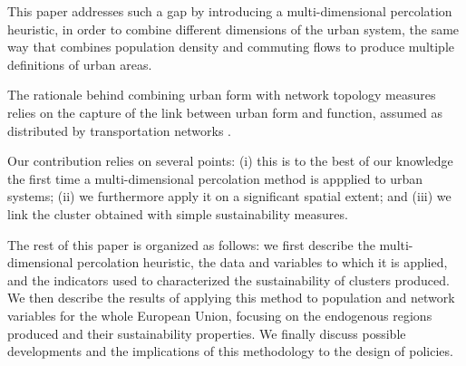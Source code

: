 \documentclass{jimis-en}
\begin{document}
This paper addresses such a gap by introducing a multi-dimensional percolation heuristic, in order to combine different dimensions of the urban system, the same way that \cite{cottineau2018defining} combines population density and commuting flows to produce multiple definitions of urban areas.

The rationale behind combining urban form with network topology measures relies on the capture of the link between urban form and function, assumed as distributed by transportation networks \citep{raimbault2018caracterisation}.







Our contribution relies on several points: (i) this is to the best of our knowledge the first time a multi-dimensional percolation method is appplied to urban systems; (ii) we furthermore apply it on a significant spatial extent; and (iii) we link the cluster obtained with simple sustainability measures.


The rest of this paper is organized as follows: we first describe the multi-dimensional percolation heuristic, the data and variables to which it is applied, and the indicators used to characterized the sustainability of clusters produced. We then describe the results of applying this method to population and network variables for the whole European Union, focusing on the endogenous regions produced and their sustainability properties. We finally discuss possible developments and the implications of this methodology to the design of policies.
\end{document}
